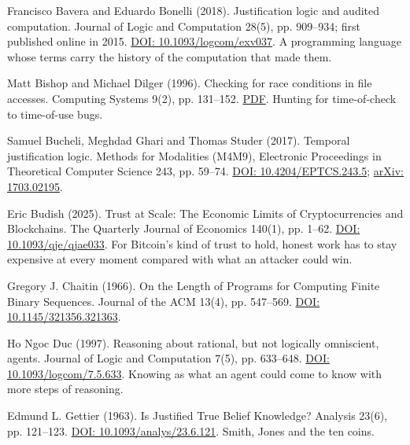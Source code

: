 \noindent Francisco Bavera and Eduardo Bonelli (2018). Justification logic and audited computation. Journal of Logic and Computation 28(5), pp. 909--934; first published online in 2015. \href{https://doi.org/10.1093/logcom/exv037}{DOI: 10.1093/logcom/exv037}. A programming language whose terms carry the history of the computation that made them.
\par\medskip

\noindent Matt Bishop and Michael Dilger (1996). Checking for race conditions in file accesses. Computing Systems 9(2), pp. 131--152. \href{https://www.usenix.org/legacy/publications/compsystems/1996/spr_bishop.pdf}{PDF}. Hunting for time-of-check to time-of-use bugs.
\par\medskip

\noindent Samuel Bucheli, Meghdad Ghari and Thomas Studer (2017). Temporal justification logic. Methods for Modalities (M4M9), Electronic Proceedings in Theoretical Computer Science 243, pp. 59--74. \href{https://doi.org/10.4204/EPTCS.243.5}{DOI: 10.4204/EPTCS.243.5}; \href{https://arxiv.org/abs/1703.02195}{arXiv: 1703.02195}.
\par\medskip

\noindent Eric Budish (2025). Trust at Scale: The Economic Limits of Cryptocurrencies and Blockchains. The Quarterly Journal of Economics 140(1), pp. 1--62. \href{https://doi.org/10.1093/qje/qjae033}{DOI: 10.1093/qje/qjae033}. For Bitcoin's kind of trust to hold, honest work has to stay expensive at every moment compared with what an attacker could win.
\par\medskip

\noindent Gregory J. Chaitin (1966). On the Length of Programs for Computing Finite Binary Sequences. Journal of the ACM 13(4), pp. 547--569. \href{https://doi.org/10.1145/321356.321363}{DOI: 10.1145/321356.321363}.
\par\medskip

\noindent Ho Ngoc Duc (1997). Reasoning about rational, but not logically omniscient, agents. Journal of Logic and Computation 7(5), pp. 633--648. \href{https://doi.org/10.1093/logcom/7.5.633}{DOI: 10.1093/logcom/7.5.633}. Knowing as what an agent could come to know with more steps of reasoning.
\par\medskip

\noindent Edmund L. Gettier (1963). Is Justified True Belief Knowledge? Analysis 23(6), pp. 121--123. \href{https://doi.org/10.1093/analys/23.6.121}{DOI: 10.1093/analys/23.6.121}. Smith, Jones and the ten coins.
\par\medskip

